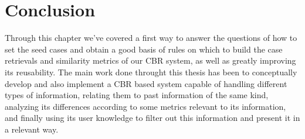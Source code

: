 \section{Conclusion}
Through this chapter we've covered a first way to answer the questions of how to set the seed cases and obtain a good basis of rules on which to build the case retrievals and similarity metrics of our CBR system, as well as greatly improving its reusability.
The main work done throught this thesis has been to conceptually develop and also implement a CBR based system capable of handling different types of information, relating them to past information of the same kind, analyzing its differences according to some metrics relevant to its information, and finally using its user knowledge to filter out this information and present it in a relevant way.
\medskip
